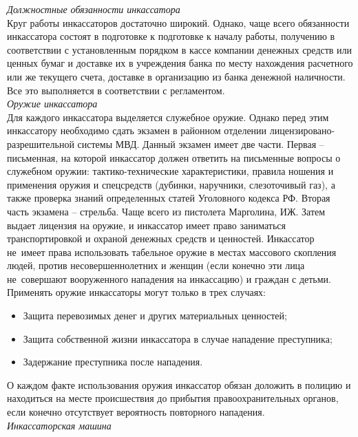 \documentclass[a4paper,12pt,fleqn]{article} %
\begin{document}
\textit{Должностные обязанности инкассатора}\\

Круг работы инкассаторов достаточно широкий. Однако, чаще всего обязанности инкассатора состоят в подготовке к подготовке к началу работы, получению в соответствии с установленным порядком в кассе компании денежных средств или ценных бумаг и доставке их в учреждения банка по месту нахождения расчетного или же текущего счета, доставке в организацию из банка денежной наличности. Все это выполняется в соответствии с регламентом.\\

\textit{Оружие инкассатора}\\

Для каждого инкассатора выделяется служебное оружие. Однако перед этим инкассатору необходимо сдать экзамен в районном отделении лицензировано-разрешительной системы МВД. Данный экзамен имеет две части. Первая – письменная, на которой инкассатор должен ответить на письменные вопросы о служебном оружии: тактико-технические характеристики, правила ношения и применения оружия и спецсредств (дубинки, наручники, слезоточивый газ), а также проверка знаний определенных статей Уголовного кодекса РФ. Вторая часть экзамена – стрельба. Чаще всего из пистолета Марголина, ИЖ. Затем выдает лицензия на оружие, и инкассатор имеет право заниматься транспортировкой и охраной денежных средств и ценностей. Инкассатор не~имеет права использовать табельное оружие в местах массового скопления людей, против несовершеннолетних и женщин (если конечно эти лица не~совершают вооруженного нападения на инкассацию) и граждан с детьми. Применять оружие инкассаторы могут только в трех случаях:

\begin{itemize}
	\item Защита перевозимых денег и других материальных ценностей;
	\item Защита собственной жизни инкассатора в случае нападение преступника;
	\item Задержание преступника после нападения.
\end{itemize}

О каждом факте использования оружия инкассатор обязан доложить в полицию и находиться на месте происшествия до прибытия правоохранительных органов, если конечно отсутствует вероятность повторного нападения.\\

\textit{Инкассаторская машина}\\
\end{document}
